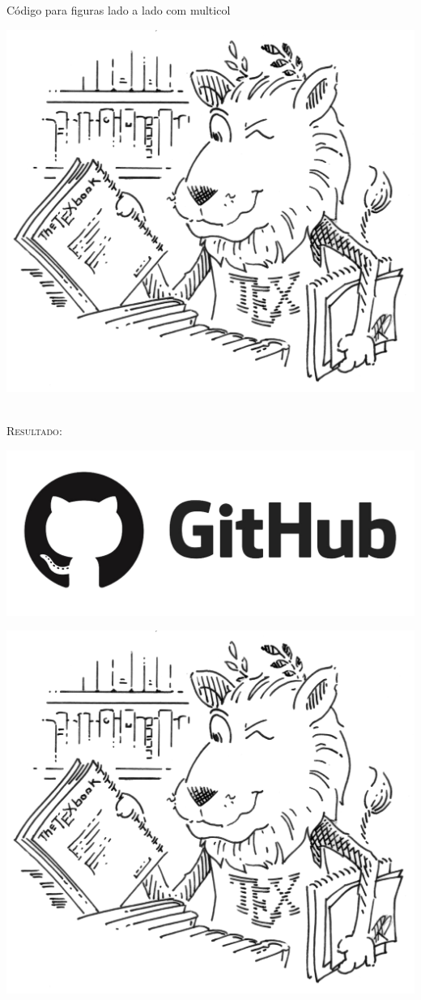 \documentclass[a4paper,12pt,oneside,openright,extrafontsizes,openbib]{memoir}
\begin{document}
{\begin{codex}{Código para figuras lado a lado com multicol}
\begin{multicols}{2}
\includegraphics[scale=.040]{./img/tex-lion.png}
\end{multicols}
\end{codex}
\ \\

\textsc{Resultado:}

\begin{multicols}{2}
	\includegraphics[scale=.15]{./img/github.png}
	
	\includegraphics[scale=.040]{./img/tex-lion.png}
\end{multicols}

}
\end{document}
